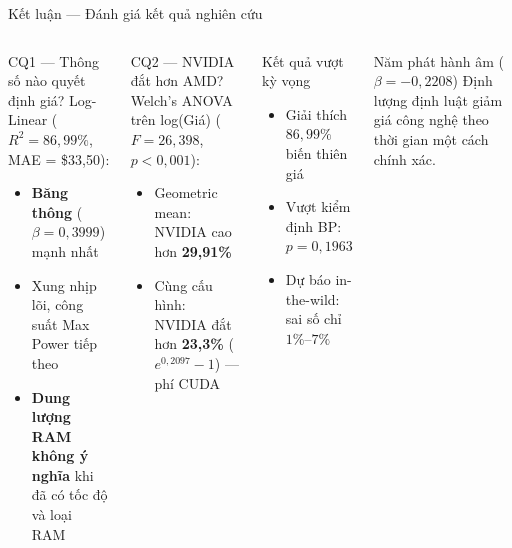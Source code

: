 \documentclass[13pt, aspectratio=169]{beamer}
\newcommand{\hl}[1]{\textcolor{red!75!black}{\textbf{#1}}}
\begin{document}
\begin{frame}{Kết luận --- Đánh giá kết quả nghiên cứu}
  \begin{columns}[T]
      \begin{block}{CQ1 --- Thông số nào quyết định giá?}
        \footnotesize
        Log-Linear ($R^2 = 86{,}99\%$, MAE = \$33,50):\\[0.3em]
        \begin{itemize}
          \item \hl{Băng thông} ($\beta = 0{,}3999$) mạnh nhất
          \item Xung nhịp lõi, công suất Max Power tiếp theo
          \item \textbf{Dung lượng RAM không ý nghĩa} khi đã có tốc độ và loại RAM
        \end{itemize}
      \end{block}
      \vspace{0.3em}
      \begin{block}{CQ2 --- NVIDIA đắt hơn AMD?}
        \footnotesize
        Welch's ANOVA trên log(Giá) ($F = 26{,}398$, $p < 0{,}001$):\\[0.3em]
        \begin{itemize}
          \item Geometric mean: NVIDIA cao hơn \hl{29,91\%}
          \item Cùng cấu hình: NVIDIA đắt hơn \hl{23,3\%} ($e^{0{,}2097}-1$) --- phí CUDA
        \end{itemize}
      \end{block}
      \begin{exampleblock}{Kết quả vượt kỳ vọng}
        \footnotesize
        \begin{itemize}
          \item Giải thích \hl{$86{,}99\%$} biến thiên giá
          \item Vượt kiểm định BP: $p = 0{,}1963$ \textcolor{green!60!black}{\checkmark}
          \item Dự báo in-the-wild: sai số chỉ $1\%$--$7\%$
        \end{itemize}
      \end{exampleblock}
      \vspace{0.35em}
      \begin{alertblock}{Năm phát hành âm ($\beta = -0{,}2208$)}
        \footnotesize
        Định lượng định luật giảm giá công nghệ theo thời gian một cách chính xác.
      \end{alertblock}
  \end{columns}
\end{frame}
\end{document}
